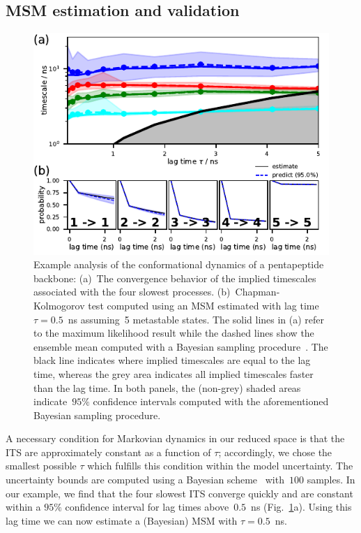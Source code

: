 \documentclass[9pt,tutorial]{livecoms}
\begin{document}
\subsection{MSM estimation and validation}

\begin{figure}
\includegraphics{figure_4}
\caption{Example analysis of the conformational dynamics of a pentapeptide backbone:
(a)~The convergence behavior of the implied timescales associated with the four slowest processes.
(b)~Chapman-Kolmogorov test computed using an MSM estimated with lag time $\tau=0.5$~ns assuming~5 metastable states.
The solid lines in (a) refer to the maximum likelihood result while the dashed lines show the ensemble mean computed with a Bayesian sampling procedure~\cite{ben-rev-msm}.
The black line indicates where implied timescales are equal to the lag time,
whereas the grey area indicates all implied timescales faster than the lag time.
In both panels, the (non-grey) shaded areas indicate~$95\%$ confidence intervals computed with the aforementioned Bayesian sampling procedure.}
\label{fig:its-and-ck}
\end{figure}

A necessary condition for Markovian dynamics in our reduced space is that the ITS are approximately constant as a function of $\tau$;
accordingly, we chose the smallest possible $\tau$ which fulfills this condition within the model uncertainty.
The uncertainty bounds are computed using a Bayesian scheme~\cite{ben-rev-msm,noe-tmat-sampling} with~$100$ samples.
In our example, we find that the four slowest ITS converge quickly and are constant within a $95\%$ confidence interval for lag times above~$0.5$~ns (Fig.~\ref{fig:its-and-ck}a).
Using this lag time we can now estimate a (Bayesian) MSM with $\tau=0.5$~ns. 
\end{document}
